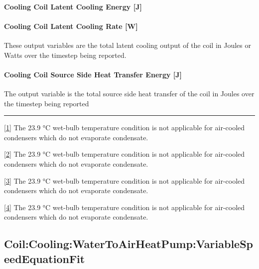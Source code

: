 \paragraph{Cooling Coil Latent Cooling Energy {[}J{]}}\label{cooling-coil-latent-cooling-energy-j-6}

\paragraph{Cooling Coil Latent Cooling Rate {[}W{]}}\label{cooling-coil-latent-cooling-rate-w-4}

These output variables are the total latent cooling output of the coil in Joules or Watts over the timestep being reported.

\paragraph{Cooling Coil Source Side Heat Transfer Energy {[}J{]}}\label{cooling-coil-source-side-heat-transfer-energy-j-3}

The output variable is the total source side heat transfer of the coil in Joules over the timestep being reported

\begin{center}\rule{0.5\linewidth}{\linethickness}\end{center}

\protect\hyperlink{ux5fftnref1}{{[}1{]}} The 23.9 °C wet-bulb temperature condition is not applicable for air-cooled condensers which do not evaporate condensate.

\protect\hyperlink{ux5fftnref2}{{[}2{]}} The 23.9 °C wet-bulb temperature condition is not applicable for air-cooled condensers which do not evaporate condensate.

\protect\hyperlink{ux5fftnref3}{{[}3{]}} The 23.9 °C wet-bulb temperature condition is not applicable for air-cooled condensers which do not evaporate condensate.

\protect\hyperlink{ux5fftnref4}{{[}4{]}} The 23.9 °C wet-bulb temperature condition is not applicable for air-cooled condensers which do not evaporate condensate.

\subsection{Coil:Cooling:WaterToAirHeatPump:VariableSpeedEquationFit}\label{coilcoolingwatertoairheatpumpvariablespeedequationfit}


